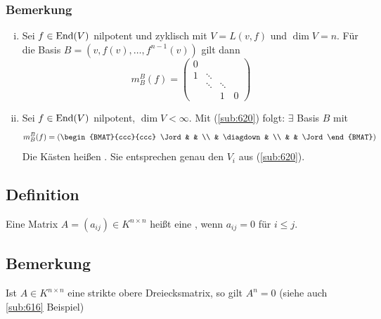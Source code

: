 \subsubsection[Bemerkung Jordankästen]{Bemerkung} %
\label{sub:6215}
\begin{enumerate}[i)]
	\item Sei $f \in \operatorname{End}(V)$ nilpotent und zyklisch mit $V=L(v,f)$ und $\dim V=n$. Für die Basis $B=(v, f(v), \ldots , f^{n-1}(v))$ gilt dann
	\[
		m_B^B(f) = \begin{pmatrix}
			0 & & & \\
			1 &\ddots & &  \\
			& \ddots & \ddots & \\
			 & & 1 & 0
		\end{pmatrix}
	\]
	\item \label{6215:enum:2} Sei $f \in \operatorname{End}(V)$ nilpotent, $\dim V < \infty$. Mit (\ref{sub:620}) folgt: $\exists$ Basis $B$ mit 
	\[
		m_B^B(f) = \left( \begin{BMAT}{ccc}{ccc}
			\Jord  &  &  \\
			 & \diagdown &  \\
			 &  & \Jord
		\end{BMAT} \right) 
	\] 
	Die Kästen heißen . Sie entsprechen genau den $V_i$ aus (\ref{sub:620}). 
\end{enumerate}

\subsection[Definition: strikte obere Dreiecksmatrix]{Definition} %
\label{sub:622}
Eine Matrix $A=(a_{ij}) \in K^{n \times n}$ heißt eine , wenn $a_{ij} = 0$ für $i \le j$. 
\marginnote{\glqq$\le$\grqq !!!}

\subsection[Bemerkung über die Potenz einer strikten oberen Dreiecksmatrix]{Bemerkung} %
\label{sub:623}
Ist $A \in K^{n \times n}$ eine strikte obere Dreiecksmatrix, so gilt $A^n=0$ \hfill {\footnotesize (siehe auch \ref{sub:616} Beispiel)}

